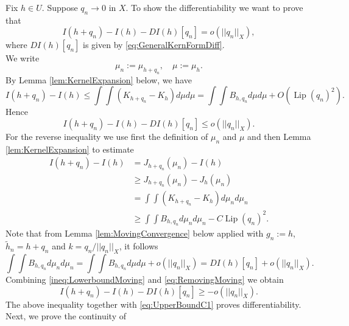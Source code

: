 \documentclass[11pt]{article}
\theoremstyle{plain}
\numberwithin{equation}{section}
\theoremstyle{definition}
\let\oldendproof\endproof
\renewenvironment{proof}[1][\proofname]{%
\oldproof[\upshape \bfseries #1]%
}{\oldendproof}
\DeclareMathOperator{\Lip}{Lip}
\begin{document}
    \begin{proof}[Proof of Proposition \ref{prop:C1Diff}]
        Fix $h \in U$. Suppose $q_n \to 0$ in $X$. To show the differentiability we want to prove that
        \begin{equation}
            \label{eq:C1LogCap}
            I(h+q_n)-I(h)-DI(h)[q_n]=o(||q_n||_X),
        \end{equation}
        where $DI(h)[q_n]$ is given by \eqref{eq:GeneralKernFormDiff}.\\
        We write
        \[
        \mu_n:=\mu_{h+q_n},\quad \mu:=\mu_h.
        \]
        By Lemma \ref{lem:KernelExpansion} below, we have
        \[
        I(h+q_n)-I(h)\leq \int\int(K_{h+q_n}-K_h)d\mu d\mu=\int\int B_{h,q_n}d\mu d\mu+O(\Lip(q_n)^2).
        \]
        Hence
        \begin{equation}
            \label{eq:UpperBoundC1}
            I(h+q_n)-I(h)-DI(h)[q_n]\leq o(||q_n||_X).
        \end{equation}
        For the reverse inequality we use first the definition of $\mu_n$ and $\mu$ and then Lemma \ref{lem:KernelExpansion} to estimate
        \begin{align}
            \label{ineq:LowerboundMoving}
            I(h+q_n)-I(h)&=J_{h+q_n}(\mu_n)-I(h) \nonumber \\
            &\geq J_{h+q_n}(\mu_n)-J_h(\mu_n) \nonumber \\
            &=\int\int(K_{h+q_n}-K_h)d\mu_nd\mu_n \nonumber \\
            &\geq\int\int B_{h,q_n}d\mu_n d\mu_n-C\Lip(q_n)^2.
        \end{align}
        Note that from Lemma \ref{lem:MovingConvergence} below applied with $g_n :=h$, $\tilde h_n =h+q_n$ and $k=q_n/||q_n||_X$, it follows
        \begin{equation}
            \label{eq:RemovingMoving}
            \int\int B_{h,q_n}d\mu_nd\mu_n=\int\int B_{h,q_n}d\mu d\mu+o(||q_n||_X)=DI(h)[q_n]+o(||q_n||_X).
        \end{equation}
        Combining \eqref{ineq:LowerboundMoving} and \eqref{eq:RemovingMoving} we obtain
        \begin{equation}
            \label{eq:LowerBoundC1}
            I(h+q_n)-I(h)-DI(h)[q_n]\geq -o(||q_n||_X).
        \end{equation}
        The above inequality together with \eqref{eq:UpperBoundC1} proves differentiability.\\
        Next, we prove the continuity of
        \[
\]
\end{proof}
\end{document}

